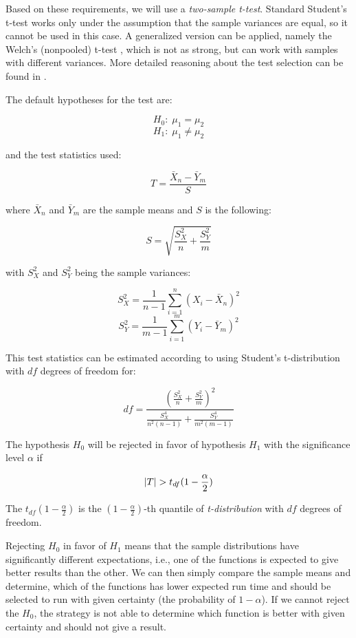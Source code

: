 Based on these requirements, we will use a \textit{two-sample t-test}. Standard Student's t-test works only under the assumption that the sample variances are equal, so it cannot be used in this case. A generalized version can be applied, namely the Welch's (nonpooled) t-test \cite{welch_generalisation_1947}, which is not as strong, but can work with samples with different variances. More detailed reasoning about the test selection can be found in \cite{weiss_introductory_2010}.

The default hypotheses for the test are:

\[
H_0: \; \mu_1 = \mu_2
\]
\[
H_1: \; \mu_1 \ne  \mu_2
\]

and the test statistics used:

\[
T = \frac{\bar{X}_n - \bar{Y}_m}{S}
\]

where $\bar{X}_n$ and $\bar{Y}_m$ are the sample means and $S$ is the following:

\[
S = \sqrt{\frac{S_X^2}{n} + \frac{S_Y^2}{m}}
\]

with $S_X^2$ and $S_Y^2$ being the sample variances:

\[
S_X^2 = \frac{1}{n-1} \sum_{i=1}^{n}(X_i - \bar{X}_n)^2
\]
\[
S_Y^2 = \frac{1}{m-1} \sum_{i=1}^{m}(Y_i - \bar{Y}_m)^2
\]

This test statistics can be estimated according to \cite{weiss_introductory_2010} using Student's t-distribution with $df$ degrees of freedom for:

\[
df = \frac{(\frac{S_X^2}{n} + \frac{S_Y^2}{m})^2}{\frac{S_X^4}{n^2(n - 1)} + \frac{S_Y^4}{m^2(m - 1)}}
\]

The hypothesis $H_0$ will be rejected in favor of hypothesis $H_1$ with the significance level $\alpha$ if

\[\left|{T}\right| > t_{df}(1-\frac{\alpha}{2})\]

The $t_{df}(1-\frac{\alpha}{2})$ is the $(1-\frac{\alpha}{2})$-th quantile of \textit{t-distribution} with $df$ degrees of freedom.

Rejecting $H_0$ in favor of $H_1$ means that the sample distributions have significantly different expectations, i.e., one of the functions is expected to give better results than the other. We can then simply compare the sample means and determine, which of the functions has lower expected run time and should be selected to run with given certainty (the probability of $1-\alpha$). If we cannot reject the $H_0$, the strategy is not able to determine which function is better with given certainty and should not give a result.

